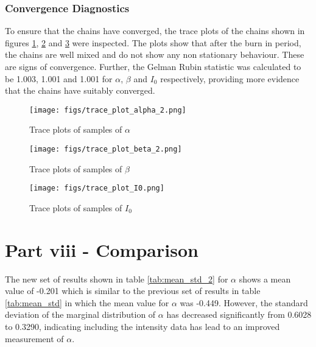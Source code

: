 \documentclass[11pt]{article}
\begin{document}
\subsubsection{Convergence Diagnostics}
To ensure that the chains have converged, the trace plots of the chains shown in figures \ref{fig:trace_plots_alpha_2}, \ref{fig:trace_plots_beta_2} and \ref{fig:trace_plots_I0} were inspected. The plots show that after the burn in period, the chains are well mixed and do not show any non stationary behaviour. These are signs of convergence. Further, the Gelman Rubin statistic was calculated to be 1.003, 1.001 and 1.001 for $\alpha$, $\beta$ and $I_0$ respectively, providing more evidence that the chains have suitably converged.

\begin{figure}[H]
    \centering
    \texttt{[image: figs/trace\_plot\_alpha\_2.png]}
    \caption{Trace plots of samples of $\alpha$}
    \label{fig:trace_plots_alpha_2}
\end{figure}

\begin{figure}[H]
    \centering
    \texttt{[image: figs/trace\_plot\_beta\_2.png]}
    \caption{Trace plots of samples of $\beta$}
    \label{fig:trace_plots_beta_2}
\end{figure}

\begin{figure}[H]
    \centering
    \texttt{[image: figs/trace\_plot\_I0.png]}
    \caption{Trace plots of samples of $I_0$}
    \label{fig:trace_plots_I0}
\end{figure}

\section{Part viii - Comparison}
The new set of results shown in table \ref{tab:mean_std_2} for $\alpha$ shows a mean value of -0.201 which is similar to the previous set of results in table \ref{tab:mean_std} in which the mean value for $\alpha$ was -0.449. However, the standard deviation of the marginal distribution of $\alpha$ has decreased significantly from 0.6028 to 0.3290, indicating including the intensity data has lead to an improved measurement of $\alpha$.



\end{document}
